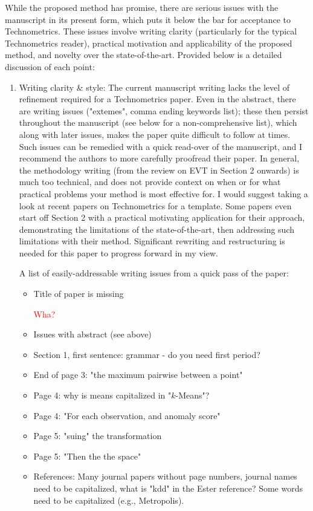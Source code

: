\documentclass{article}
\newcommand{\makenote}[1]{\textcolor{red}{#1}}
\begin{document}
While the proposed method has promise, there are serious issues with the manuscript in its present
    form, which puts it below the bar for acceptance to Technometrics. These issues involve writing 
    clarity (particularly for the typical Technometrics reader), practical motivation and 
    applicability of the proposed method, and novelty over the state-of-the-art. Provided below 
    is a detailed discussion of each point:

\begin{enumerate}

\item Writing clarity \& style: The current manuscript writing lacks the level of refinement 
    required for a Technometrics paper. Even in the abstract, there are writing issues 
    ("extemes", comma ending keywords list); these then persist throughout the manuscript 
    (see below for a non-comprehensive list), which along with later issues, makes the paper 
    quite difficult to follow at times. Such issues can be remedied with a quick read-over of 
    the manuscript, and I recommend the authors to more carefully proofread their paper. In 
    general, the methodology writing (from the review on EVT in Section 2 onwards) is much too 
    technical, and does not provide context on when or for what practical problems your method 
    is most effective for. I would suggest taking a look at recent papers on Technometrics for 
    a template. Some papers even start off Section 2 with a practical motivating application 
    for their approach, demonstrating the limitations of the state-of-the-art, then addressing 
    such limitations with their method. Significant rewriting and restructuring is needed for 
    this paper to progress forward in my view. 

    A list of easily-addressable writing issues from a quick pass of the paper:
    \begin{itemize}
    \item Title of paper is missing
        
        \makenote{Wha?}

    \item Issues with abstract (see above)
    \item Section 1, first sentence: grammar - do you need first period? 
    \item End of page 3: "the maximum pairwise between a point"
    \item Page 4: why is means capitalized in "$k$-Means"?
    \item Page 4: "For each observation, and anomaly score"
    \item Page 5: "suing" the transformation
    \item Page 5: "Then the the space"
    \item References: Many journal papers without page numbers, journal names need to be 
        capitalized, what is "kdd" in the Ester reference? Some words need to be capitalized 
        (e.g., Metropolis).
    \end{itemize}


\end{enumerate}
\end{document}
